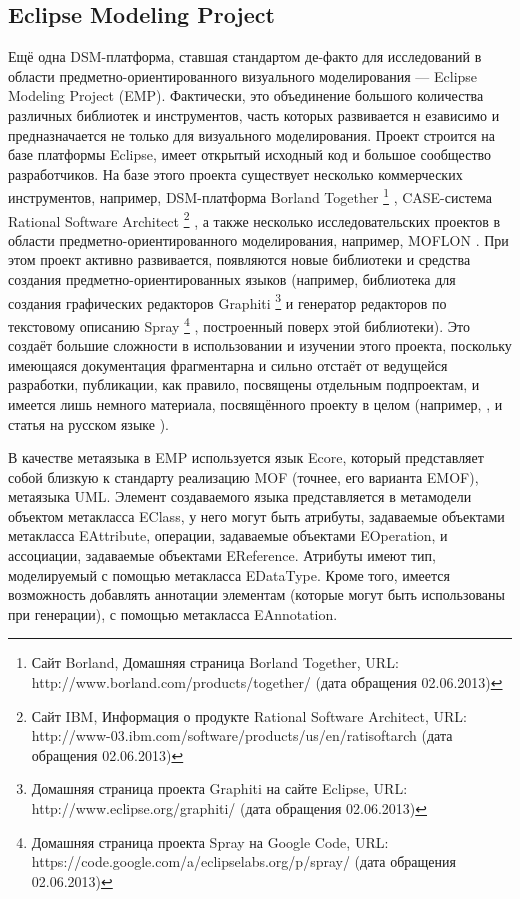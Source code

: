 \subsection{Eclipse Modeling Project}
Ещё одна DSM-платформа, ставшая стандартом де-факто для исследований в области предметно-ориентированного визуального моделирования --- 
Eclipse Modeling Project (EMP). Фактически, это объединение большого количества различных библиотек и инструментов, часть которых развивается н
езависимо и предназначается не только для визуального моделирования. Проект строится на базе платформы 
Eclipse, имеет открытый исходный код и большое сообщество разработчиков. На базе этого 
проекта существует несколько коммерческих инструментов, например, DSM-платформа Borland Together
\footnote{Сайт Borland, Домашняя страница Borland Together, URL: http://www.borland.com/products/together/ (дата обращения 02.06.2013)}
, CASE-система Rational Software Architect
\footnote{Сайт IBM, Информация о продукте Rational Software Architect, 
URL: http://www-03.ibm.com/software/products/us/en/ratisoftarch (дата обращения 02.06.2013)}
, а также несколько исследовательских проектов в области предметно-ориентированного моделирования, например, MOFLON
. При этом проект активно развивается, появляются новые библиотеки и средства создания предметно-ориентированных 
языков (например, библиотека для создания графических редакторов Graphiti 
\footnote{Домашняя страница проекта Graphiti на сайте Eclipse, URL: http://www.eclipse.org/graphiti/ (дата обращения 02.06.2013)}
и генератор редакторов по текстовому описанию Spray
\footnote{Домашняя страница проекта Spray на Google Code, URL: https://code.google.com/a/eclipselabs.org/p/spray/ (дата обращения 02.06.2013)}
, построенный поверх этой библиотеки). Это создаёт большие сложности в использовании и изучении этого проекта, поскольку имеющаяся документация 
фрагментарна и сильно отстаёт от ведущейся разработки, публикации, как правило, посвящены 
отдельным подпроектам, и имеется лишь немного материала, посвящённого проекту в целом 
(например, \cite{gronback2009eclipse}, и статья на русском языке \cite{sorokin2010obzor}).

В качестве метаязыка в EMP используется язык Ecore, который представляет собой близкую 
к стандарту реализацию MOF (точнее, его варианта EMOF), метаязыка UML. Элемент создаваемого 
языка представляется в метамодели объектом метакласса EClass, у него могут быть атрибуты, 
задаваемые объектами метакласса EAttribute, операции, задаваемые объектами EOperation, и 
ассоциации, задаваемые объектами EReference. Атрибуты имеют тип, моделируемый с помощью 
метакласса EDataType. Кроме того, имеется возможность добавлять аннотации элементам 
(которые могут быть использованы при генерации), с помощью метакласса EAnnotation.

